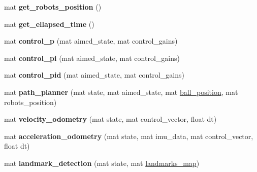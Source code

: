 \begin{DoxyCompactItemize}
\item 
\mbox{\label{class_robot_navigation_a9082eefeea50d92c1cf1ea07620733c3}} 
mat {\bfseries get\+\_\+robots\+\_\+position} ()
\item 
\mbox{\label{class_robot_navigation_a63b9ea0c29057b9be47cccff6010eb8b}} 
mat {\bfseries get\+\_\+ellapsed\+\_\+time} ()
\item 
\mbox{\label{class_robot_navigation_a81ea2b1ff7b0701a716ab6b8bac92be4}} 
mat {\bfseries control\+\_\+p} (mat aimed\+\_\+state, mat control\+\_\+gains)
\item 
\mbox{\label{class_robot_navigation_aa00a37c4a425f8ba2b83a208845747f5}} 
mat {\bfseries control\+\_\+pi} (mat aimed\+\_\+state, mat control\+\_\+gains)
\item 
\mbox{\label{class_robot_navigation_a5800adf6538584180ca33a2143934dfd}} 
mat {\bfseries control\+\_\+pid} (mat aimed\+\_\+state, mat control\+\_\+gains)
\item 
\mbox{\label{class_robot_navigation_a676195ab5a04e08452dc6fb23f84ce10}} 
mat {\bfseries path\+\_\+planner} (mat state, mat aimed\+\_\+state, mat \hyperlink{class_robot_navigation_a1e4f1a5b3c01ba9be911c006b478f371}{ball\+\_\+position}, mat robots\+\_\+position)
\item 
\mbox{\label{class_robot_navigation_a50667808e539f4b632af5f60628cc228}} 
mat {\bfseries velocity\+\_\+odometry} (mat state, mat control\+\_\+vector, float dt)
\item 
\mbox{\label{class_robot_navigation_a0ca549632dc878d276ab2da06e5ed41b}} 
mat {\bfseries acceleration\+\_\+odometry} (mat state, mat imu\+\_\+data, mat control\+\_\+vector, float dt)
\item 
\mbox{\label{class_robot_navigation_a94927041a7f2f2bc9c45803a84d5a9d6}} 
mat {\bfseries landmark\+\_\+detection} (mat state, mat \hyperlink{class_robot_navigation_a1efd2001bd7cd70cc80d1c05b1c97988}{landmarks\+\_\+map})
\end{DoxyCompactItemize}
